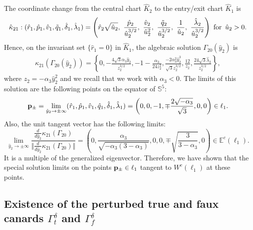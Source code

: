 \documentclass[11pt]{article}
\numberwithin{equation}{section}
\begin{document}
The coordinate change from the central chart $\hat{K}_2$ to the entry/exit chart $\hat{K}_1$ is
\begin{equation} \label{eq:kappa21}
\hat{\kappa}_{21}: 
  (\hat{r}_1, \hat{p}_1, \hat{v}_1, \tilde{q}_1, \hat{\delta}_1, \hat{\lambda}_1)
  =\left(\hat{r}_2 \sqrt{\hat{u}_2}, \, \, 
    \frac{\hat{p}_2}{\hat{u}_2^{3/2}}, \, \, 
    \frac{\hat{v}_2}{\hat{u}_2^2},  \, \,
    \frac{\tilde{q}_2}{\hat{u}_2^{3/2}}, \, \,
    \frac{1}{\hat{u}_2}, \, \,
    \frac{\hat{\lambda}_2}{\hat{u}_2^{3/2}}\right) \, \, {\rm for} \, \, \, \hat{u}_2>0.
\end{equation}
Hence, on the invariant set $\{ \hat{r}_1=0 \}$ in $\hat{K}_1$, the algebraic solution $\Gamma_{20}(\hat{y}_2)$ is
%
\begin{equation}\label{eq:limitGamma20}
   \begin{split}
       \kappa_{21}(\Gamma_{20}(\hat{y}_2)) = \left\{ 0, 
       -\frac{4\sqrt{3}\alpha_3 \hat{y}_2}{ z_2^{3/2}}, 
       -1-\frac{\alpha_3}{24 z_2^2}, 
       \frac{-2 \alpha_3^2\hat{y}_2^3}{\sqrt{3}z_2^{3/2}}, 
       \frac{12}{z_2}, \frac{24 \sqrt{3} \hat \lambda_2}{z_2^{3/2}} \right\}, 
   \end{split} 
\end{equation}
%
where $z_2 = -\alpha_3 \hat{y}_2^2$
and we recall that we work with $\alpha_3 < 0$.
The limits of this solution are the following points on the equator of $\mathbb{S}^5$:
\begin{equation}\label{eq:p-pm-RFSNII}
   {\bf p}_\pm = 
    \lim_{\hat{y}_2 \to \pm \infty} 
    (\hat{r}_1,\hat{p}_1,\hat{v}_1,\hat{q}_1,\hat{\delta}_1,\hat{\lambda}_1)
    = \left(0,0,-1,\mp\frac{2\sqrt{-\alpha_3}}{\sqrt{3}},0,0\right) \in \ell_1.
\end{equation}
Also, the unit tangent vector has the following limits:
%
\begin{equation}\label{eq:limit-tanvectors}
\lim_{\hat{y}_2 \to \pm \infty} 
\frac{\frac{d}{d\hat{y}_2}\kappa_{21}(\Gamma_{20})}{\Vert \frac{d}{d\hat{y}_2}\kappa_{21}(\Gamma_{20})\Vert}
= \left(0, 
\frac{\alpha_3}{\sqrt{-\alpha_3(3-\alpha_3)}}, 
0, 0,
\mp \sqrt{\frac{3}{3 - \alpha_3}},  
0 \right) \in \mathbb E^c(\ell_1).
\end{equation}
%
It is a multiple of the generalized eigenvector.
Therefore, we have shown that the special solution limits on the points ${\bf p}_\pm \in \ell_1$ tangent to $W^{c}(\ell_1)$ at these points.

\subsection{Existence of the perturbed true and faux canards 
\texorpdfstring{$\Gamma^\delta_t$ and $\Gamma^\delta_f$}{Lg}}
\label{sec:persistence-RFSNII}
\end{document}
